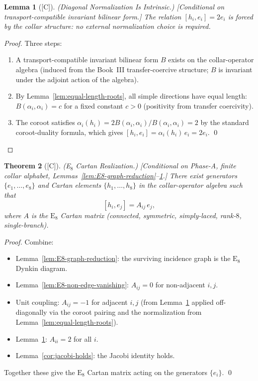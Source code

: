 \documentclass[12pt,oneside]{amsbook}
\theoremstyle{plain}
\newtheorem{theorem}{Theorem}[section]
\newtheorem{lemma}[theorem]{Lemma}
\theoremstyle{definition}
\theoremstyle{remark}
\newcommand{\status}[1]{\textup{[#1]}}
\begin{document}
\begin{lemma}[\status{C}]\label{lem:diagonal-normalization}
\textup{(Diagonal Normalization Is Intrinsic.)}
\textup{[Conditional on transport-compatible invariant bilinear form.]}
The relation $[h_i, e_i] = 2e_i$ is forced by the collar structure:
no external normalization choice is required.
\end{lemma}

\begin{proof}
Three steps:
\begin{enumerate}[label=\textup{(\alph*)}]
 \item A transport-compatible invariant bilinear form $B$ exists on
 the collar-operator algebra (induced from the Book~III
 transfer-coercive structure; $B$ is invariant under the adjoint
 action of the algebra).
 \item By Lemma~\ref{lem:equal-length-roots}, all simple directions
 have equal length: $B(\alpha_i,\alpha_i) = c$ for a fixed constant
 $c > 0$ (positivity from transfer coercivity).
 \item The coroot satisfies $\alpha_i(h_i) = 2B(\alpha_i,\alpha_i)/
 B(\alpha_i,\alpha_i) = 2$ by the standard coroot-duality formula,
 which gives $[h_i, e_i] = \alpha_i(h_i)\,e_i = 2e_i$. \qed
\end{enumerate}
\end{proof}

\begin{theorem}[\status{C}]\label{thm:cartan-realization}
\textup{(E$_8$ Cartan Realization.)}
\textup{[Conditional on Phase-A, finite collar alphabet,
Lemmas~\ref{lem:E8-graph-reduction}--\ref{lem:diagonal-normalization}.]}
There exist generators $\{e_1,\ldots,e_8\}$ and Cartan elements
$\{h_1,\ldots,h_8\}$ in the collar-operator algebra such that
\[
 [h_i, e_j] = A_{ij}\,e_j,
\]
where $A$ is the $\mathrm{E}_8$ Cartan matrix (connected, symmetric,
simply-laced, rank-$8$, single-branch).
\end{theorem}

\begin{proof}
Combine:
\begin{itemize}
 \item Lemma~\ref{lem:E8-graph-reduction}: the surviving incidence
 graph is the $\mathrm{E}_8$ Dynkin diagram.
 \item Lemma~\ref{lem:E8-non-edge-vanishing}: $A_{ij} = 0$ for non-adjacent $i,j$.
 \item Unit coupling: $A_{ij} = -1$ for adjacent $i,j$
 (from Lemma~\ref{lem:diagonal-normalization} applied off-diagonally
 via the coroot pairing and the normalization from
 Lemma~\ref{lem:equal-length-roots}).
 \item Lemma~\ref{lem:diagonal-normalization}: $A_{ii} = 2$ for all $i$.
 \item Lemma~\ref{cor:jacobi-holds}: the Jacobi identity holds.
\end{itemize}
Together these give the $\mathrm{E}_8$ Cartan matrix acting on the
generators $\{e_i\}$. \qed
\end{proof}
\end{document}
